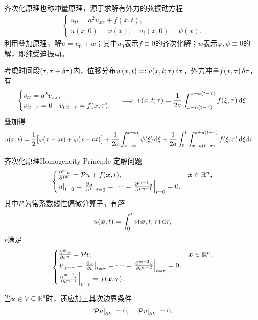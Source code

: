 齐次化原理也称冲量原理，源于求解有外力的弦振动方程
\begin{align*}
	\begin{cases}
		u_{tt}=a^2u_{xx}+f(x,t),\\
		u(x,0)=\varphi(x),\quad u_t(x,0)=\psi(x).
	\end{cases}
\end{align*}
利用叠加原理，解$u=u_0+w$；其中$u_0$表示$f\equiv 0$的齐次化解；$w$表示$\varphi,\psi\equiv 0$的解，即纯受迫振动。

考虑时间段$(\tau,\tau+\vd\tau)$内，位移分布$w(x,t)=:v(x,t;\tau)\vd\tau$，外力冲量$f(x,\tau)\vd\tau$，有
\begin{align*}
	\begin{cases}
			v_{tt}=a^2v_{xx},\\
			v|_{t=\tau}=0\quad v_t|_{t=\tau}=f(x,\tau).
	\end{cases}\implies v(x,t;\tau)=\frac1{2a}\int_{x-a(t-\tau)}^{x+a(t-\tau)}f(\xi,\tau)\d\xi.
\end{align*}
叠加得
\begin{align}
	\begin{aligned}
		u(x,t)= {}&\frac12\bigfkh{\varphi(x-at)+\varphi(x+at)}+\frac1{2a}\int_{x-at}^{x+at}\psi(\xi)\d\xi+\frac1{2a}\int_0^t\int_{x-a(t-\tau)}^{x+a(t-\tau)}f(\xi,\tau)\d\xi\nd\tau.
	\end{aligned}
\end{align}
\begin{theorem}{齐次化原理}{Homogeneity Principle}
	定解问题
	\begin{align*}
		\begin{cases}
			\frac{\p^mu}{\p t^m}=\Par u+f(\bm x,t),&\bm x\in\mathbb R^n,\\
			\edg u_{t=0}=\edg{\pv ut}_{t=0}=\cdots=\edg{\frac{\p^{m-1}u}{\p t^{m-1}}}_{t=0}=0.
		\end{cases}
	\end{align*}
	其中$\Par$为常系数线性偏微分算子，有解
	\[
		u(\bm x,t)=\int_0^tv(\bm x,t;\tau)\d\tau,
	\]
	$v$满足
	\begin{align*}
		\begin{cases}
			\pv[m]vt=\Par v,&\bm x\in\mathbb R^n,\\
			\edg v_{t=\tau}=\edg{\pv v{t}}_{t=\tau}=\cdots=\edg{\pv[m-2]vt}_{t=\tau}=0, \\
			\edg{\pv[m-1]vt}_{t=\tau}=f(\bm x,\tau).
		\end{cases}
	\end{align*}

	当$\bm x\in V\subsetneq\mathbb R^n$时，还应加上其次边界条件
	\[
		\edg{\Par u}_{\p V}=0,\quad\edg{\Par v}_{\p V}=0.
	\]
\end{theorem}

